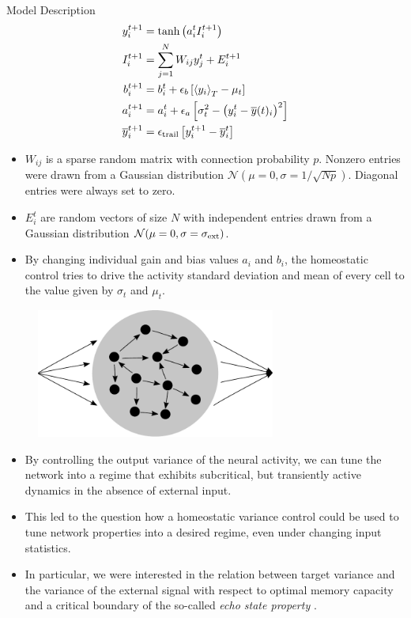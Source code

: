 \documentclass{beamer}
\newcommand{\avgt}[1]{\left< #1 \right>_T}
\begin{document}
\begin{frame}[t]
\begin{columns}[t]
\begin{column}{.4\textwidth}
\begin{myblock}{Model Description}
\begin{align*}
y_i^{t+1} &= \mathrm{tanh}\left( a_i^t I_i^{t+1} \right) \\
I_i^{t+1} &= \sum_{j=1}^{N} W_{ij} y_j^t + E_i^{t+1}  \\
b_i^{t+1} &= b_i^t + \epsilon_{b} \left[ \avgt{y_i} - \mu_{t} \right] \\
a_i^{t+1} &= a_i^{t} + \epsilon_{a} \left[ \sigma_{t}^2 - \left( y_i^t - \overline{y}(t)_i\right)^2 \right]  \\
\overline{y}^{t+1}_i &= \epsilon_{\rm trail} \left[ y_i^{t+1} - \overline{y}^{t}_i\right]
\end{align*}
\begin{itemize}
	\item $W_{ij}$ is a sparse random matrix with connection probability $p$. Nonzero entries were drawn from a Gaussian distribution $\mathcal{N}(\mu = 0,\sigma = 1/\sqrt{N p})$. Diagonal entries were always set to zero.
	\item $E^t_{i}$ are random vectors of size $N$ with independent entries drawn from a Gaussian distribution $\mathcal{N}(\mu = 0,\sigma = \sigma_{\rm ext})$.
	\item By changing individual gain and bias values $a_i$ and $b_i$, the homeostatic control tries to drive the activity standard deviation and mean of every cell to the value given by $\sigma_{t}$ and $\mu_{t}$.
\end{itemize}
\vspace{20pt}
\begin{figure}
	\centering
	\includegraphics[width=0.7\textwidth]{../figures/illustration.pdf}
\end{figure}
\begin{itemize}
	\item By controlling the output variance of the neural activity, we can tune the network into a regime that exhibits subcritical, but transiently active dynamics in the absence of external input.
	\item This led to the question how a homeostatic variance control could be used to tune network properties into a desired regime, even under changing input statistics.
	\item In particular, we were interested in the relation between target variance and the variance of the external signal with respect to optimal memory capacity and a critical boundary of the so-called \textit{echo state property} \cite{Jaeger_2001}. 
\end{itemize}
\end{myblock}


\end{column}
\end{columns}
\end{frame}
\end{document}

